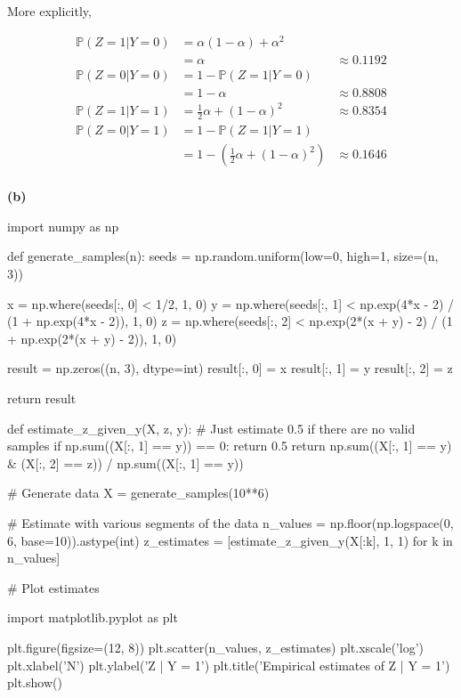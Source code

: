 More explicitly,

\[ 
\begin{align}
\mathbb{P}(Z = 1 | Y = 0) &= \alpha (1 - \alpha) + \alpha^2 \\
&= \alpha  &\approx 0.1192 \\
\mathbb{P}(Z = 0 | Y = 0) &= 1 - \mathbb{P}(Z = 1 | Y = 0) \\
&= 1 - \alpha &\approx 0.8808\\
\mathbb{P}(Z = 1 | Y = 1) &= \frac{1}{2} \alpha + (1 - \alpha)^2 &\approx 0.8354\\
\mathbb{P}(Z = 0 | Y = 1) &= 1 - \mathbb{P}(Z = 1 | Y = 1) \\
&= 1 - \left(\frac{1}{2} \alpha + (1 - \alpha)^2 \right) &\approx 0.1646\\
\end{align}
\]

\textbf{(b)}

\begin{python}
import numpy as np

def generate_samples(n):
    seeds = np.random.uniform(low=0, high=1, size=(n, 3))
    
    x = np.where(seeds[:, 0] < 1/2, 1, 0)
    y = np.where(seeds[:, 1] < np.exp(4*x - 2) / (1 + np.exp(4*x - 2)), 1, 0)
    z = np.where(seeds[:, 2] < np.exp(2*(x + y) - 2) / (1 + np.exp(2*(x + y) - 2)), 1, 0)
    
    result = np.zeros((n, 3), dtype=int)
    result[:, 0] = x
    result[:, 1] = y
    result[:, 2] = z
    
    return result

def estimate_z_given_y(X, z, y):
    # Just estimate 0.5 if there are no valid samples
    if np.sum((X[:, 1] == y)) == 0:
        return 0.5
    return np.sum((X[:, 1] == y) & (X[:, 2] == z)) / np.sum((X[:, 1] == y))
\end{python}

\begin{python}
# Generate data
X = generate_samples(10**6)
\end{python}

\begin{python}
# Estimate with various segments of the data
n_values = np.floor(np.logspace(0, 6, base=10)).astype(int)
z_estimates = [estimate_z_given_y(X[:k], 1, 1) for k in n_values]
\end{python}

\begin{python}
# Plot estimates

import matplotlib.pyplot as plt

plt.figure(figsize=(12, 8))
plt.scatter(n_values, z_estimates)
plt.xscale('log')
plt.xlabel('N')
plt.ylabel('Z | Y = 1')
plt.title('Empirical estimates of Z | Y = 1')
plt.show()
\end{python}


